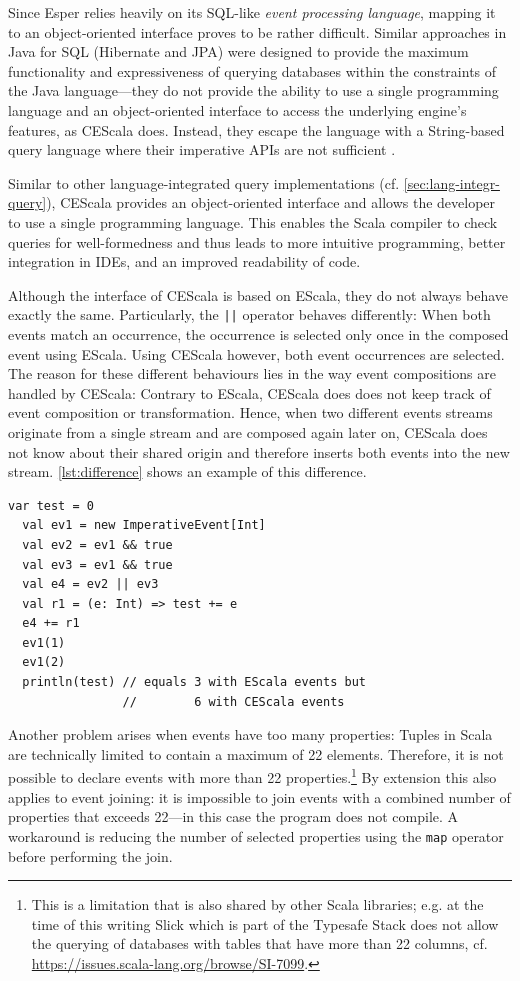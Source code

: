 \documentclass[book,type=bsc,colorback,accentcolor=tud8b,12pt,twoside]{tudthesis}
\begin{document}
Since Esper relies heavily on its SQL-like \emph{event processing language}, mapping it to an object-oriented interface proves to be rather difficult.  Similar approaches in Java for SQL (Hibernate and JPA) were designed to provide the maximum functionality and expressiveness of querying databases within the constraints of the Java language---they do not provide the ability to use a single programming language and an object-oriented interface to access the underlying engine's features, as CEScala does.  Instead, they escape the language with a String-based query language where their imperative APIs are not sufficient \cite{Squeryl}.

Similar to other language-integrated query implementations (cf. \autoref{sec:lang-integr-query}), CEScala provides an object-oriented interface and allows the developer to use a single programming language.  This enables the Scala compiler to check queries for well-formedness and thus leads to more intuitive programming, better integration in IDEs, and an improved readability of code.  

Although the interface of CEScala is based on EScala, they do not always behave exactly the same.  Particularly, the \mbox{\texttt{||}} operator behaves differently: When both events match an occurrence, the occurrence is selected only once in the composed event using EScala. Using CEScala however, both event occurrences are selected.  The reason for these different behaviours lies in the way event compositions are handled by CEScala: Contrary to EScala, CEScala does does not keep track of event composition or transformation.  Hence, when two different events streams originate from a single stream and are composed again later on, CEScala does not know about their shared origin and therefore inserts both events into the new stream.  \autoref{lst:difference} shows an example of this difference.  

\begin{lstlisting}[caption=Difference between EScala and CEScala regarding the \mbox{\texttt{||}} operator,label=lst:difference,float=tp]
  var test = 0
  val ev1 = new ImperativeEvent[Int]
  val ev2 = ev1 && true
  val ev3 = ev1 && true
  val e4 = ev2 || ev3
  val r1 = (e: Int) => test += e
  e4 += r1
  ev1(1)
  ev1(2)
  println(test) // equals 3 with EScala events but
                //        6 with CEScala events
\end{lstlisting}

Another problem arises when events have too many properties: Tuples in Scala are technically limited to contain a maximum of 22 elements.  Therefore, it is not possible to declare events with more than 22 properties.\footnote{This is a limitation that is also shared by other Scala libraries; e.g. at the time of this writing Slick which is part of the Typesafe Stack does not allow the querying of databases with tables that have more than 22 columns, cf. \url{https://issues.scala-lang.org/browse/SI-7099}.}  By extension this also applies to event joining: it is impossible to join events with a combined number of properties that exceeds 22---in this case the program does not compile.  A workaround is reducing the number of selected properties using the \mbox{\texttt{map}} operator before performing the join.  
\end{document}
